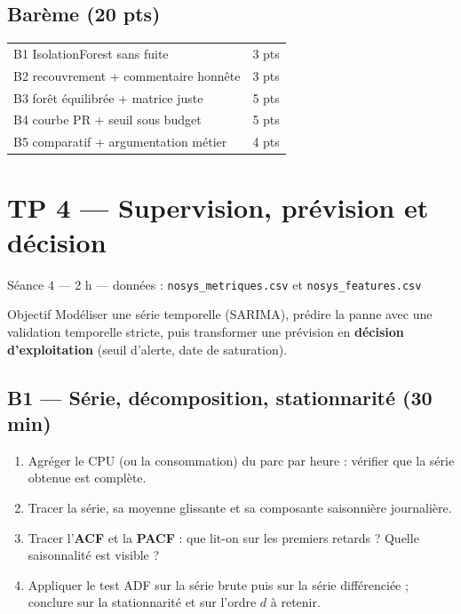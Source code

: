 \documentclass[11pt,a4paper]{article}
\newcommand{\file}[1]{\texttt{\small #1}}
\begin{document}
\subsection*{Barème (20 pts)}
\begin{center}\small
\begin{tabular}{@{}p{11.2cm}c@{}}
\toprule
B1 IsolationForest sans fuite & 3 pts\\
B2 recouvrement + commentaire honnête & 3 pts\\
B3 forêt équilibrée + matrice juste & 5 pts\\
B4 courbe PR + seuil sous budget & 5 pts\\
B5 comparatif + argumentation métier & 4 pts\\
\bottomrule
\end{tabular}
\end{center}

\newpage
\section*{TP 4 --- Supervision, prévision et décision}
{\small\color{grisdoux}Séance 4 --- 2 h --- données : \file{nosys\_metriques.csv} et \file{nosys\_features.csv}}

\begin{obj}{Objectif}
Modéliser une série temporelle (SARIMA), prédire la panne avec une validation
temporelle stricte, puis transformer une prévision en \textbf{décision
d'exploitation} (seuil d'alerte, date de saturation).
\end{obj}

\subsection*{B1 --- Série, décomposition, stationnarité (30 min)}
\begin{enumerate}
\item Agréger le CPU (ou la consommation) du parc par heure : vérifier que la
série obtenue est complète.
\item Tracer la série, sa moyenne glissante et sa composante saisonnière
journalière.
\item Tracer l'\textbf{ACF} et la \textbf{PACF} : que lit-on sur les premiers
retards ? Quelle saisonnalité est visible ?
\item Appliquer le test ADF sur la série brute puis sur la série
différenciée ; conclure sur la stationnarité et sur l'ordre $d$ à retenir.
\end{enumerate}
\end{document}
